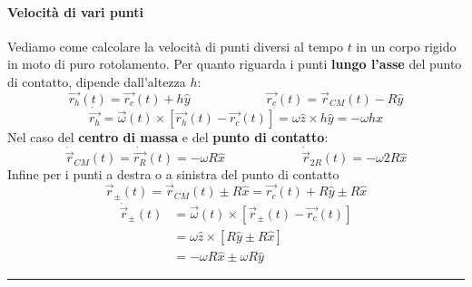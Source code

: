 \paragraph{Velocità di vari punti} Vediamo come calcolare la velocità di punti diversi al tempo $t$ in un corpo rigido in moto di puro rotolamento. Per quanto riguarda i punti \textbf{lungo l'asse} del punto di contatto, dipende dall'altezza $h$:
\begin{equation*}
	\vec{r_h}(t) = \vec{r_c}(t) + h\widehat{y} \qquad\qquad\qquad \vec{r_c}(t) = \vec{r}_{CM}(t)-R\widehat{y}
\end{equation*}
\begin{equation}
	\dot{\vec{r_h}} = \vec{\omega}(t) \times [\vec{r_h}(t) - \vec{r_c}(t)] = \omega\widehat{z} \times h \widehat{y} = -\omega h \widehat{x}
\end{equation}
Nel caso del \textbf{centro di massa} e del \textbf{punto di contatto}:
\begin{equation}
	\dot{\vec{r}}_{CM}(t) = \dot{\vec{r_R}}(t) = -\omega R \widehat{x} \qquad\qquad\qquad \dot{\vec{r}}_{2R}(t) = -\omega2R\widehat{x}
\end{equation}
Infine per i punti a destra o a sinistra del punto di contatto
\begin{equation*}
	\vec{r}_\pm(t) = \vec{r}_{CM}(t) \pm R \widehat{x} = \vec{r_c}(t) + R\widehat{y}\pm R \widehat{x}
\end{equation*}
\begin{equation}
	\begin{split}
		\dot{\vec{r}}_\pm(t) & = \vec{\omega}(t) \times [\vec{r}_\pm(t) - \vec{r_c}(t)] \\
		& = \omega \widehat{z} \times [R\widehat{y}\pm R\widehat{x}] \\
		& = -\omega R \widehat{x} \pm \omega R \widehat{y}
	\end{split}
\end{equation}

\noindent\rule[0.5ex]{\linewidth}{.5pt}

